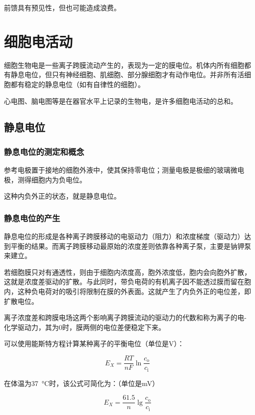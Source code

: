 前馈具有预见性，但也可能造成浪费。

\section{细胞电活动}

细胞生物电是一些离子跨膜流动产生的，表现为一定的膜电位。机体内所有细胞都有静息电位，但只有神经细胞、肌细胞、部分腺细胞才有动作电位。并非所有活细胞都有稳定的静息电位（如有自律性的细胞）。

心电图、脑电图等是在器官水平上记录的生物电，是许多细胞电活动的总和。

\subsection{静息电位}

\subsubsection{静息电位的测定和概念}

参考电极置于接地的细胞外液中，使其保持零电位；测量电极是极细的玻璃微电极，测得细胞内为负电位。

这种内负外正的状态，就是静息电位。

\subsubsection{静息电位的产生}

静息电位的形成是各种离子跨膜移动的电驱动力（阻力）和浓度梯度（驱动力）达到平衡的结果。而离子跨膜移动最原始的浓度差则依靠各种离子泵，主要是钠钾泵来建立。

若细胞膜只对有通透性，则由于细胞内浓度高，胞外浓度低，胞内会向胞外扩散，这就是浓度差驱动的扩散。与此同时，带负电荷的有机离子因不能透过膜而留在胞内，这种负电荷对的吸引将限制在膜的外表面。这就产生了内负外正的电位差，即扩散电位。

离子浓度差和跨膜电场这两个影响离子跨膜流动的驱动力的代数和称为离子的电-化学驱动力，其为0时，膜两侧的电位差便稳定下来。

可以使用能斯特方程计算某种离子的平衡电位（单位是\si{\V}）：

\[E_X = \frac{RT}{nF} \ln \frac{c_\text{o}}{c_\text{i}}\]

在体温为\SI{37}{\degreeCelsius}时，该公式可简化为：（单位是\si{\mV}）

\[E_X = \frac{61.5}{n} \lg \frac{c_\text{o}}{c_\text{i}}\]

